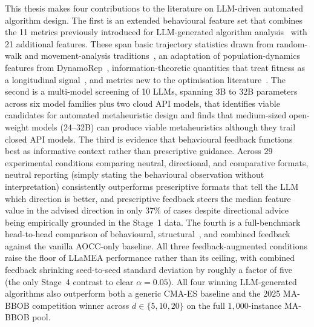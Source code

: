 \medskip

This thesis makes four contributions to the literature on LLM-driven automated algorithm design. The first is an extended behavioural feature set that combines the 11 metrics previously introduced for LLM-generated algorithm analysis~\cite{vanStein2025Behaviour} with 21 additional features. These span basic trajectory statistics drawn from random-walk and movement-analysis traditions~\cite{codling2008randomwalk}, an adaptation of population-dynamics features from DynamoRep~\cite{cenikj2023dynamorep}, information-theoretic quantities that treat fitness as a longitudinal signal~\cite{richman2000sampen,bandt2002permutation,weinberger1990fitness,lempel1976complexity}, and metrics new to the optimisation literature~\cite{barabasi2005bursts}. The second is a multi-model screening of 10 LLMs, spanning 3B to 32B parameters across six model families plus two cloud API models, that identifies viable candidates for automated metaheuristic design and finds that medium-sized open-weight models (24--32B) can produce viable metaheuristics although they trail closed API models. The third is evidence that behavioural feedback functions best as informative context rather than prescriptive guidance. Across 29 experimental conditions comparing neutral, directional, and comparative formats, neutral reporting (simply stating the behavioural observation without interpretation) consistently outperforms prescriptive formats that tell the LLM which direction is better, and prescriptive feedback steers the median feature value in the advised direction in only 37\% of cases despite directional advice being empirically grounded in the Stage~1 data. The fourth is a full-benchmark head-to-head comparison of behavioural, structural~\cite{vanStein2026LLaMEASAGE}, and combined feedback against the vanilla AOCC-only baseline. All three feedback-augmented conditions raise the floor of LLaMEA performance rather than its ceiling, with combined feedback shrinking seed-to-seed standard deviation by roughly a factor of five (the only Stage~4 contrast to clear $\alpha = 0.05$). All four winning LLM-generated algorithms also outperform both a generic CMA-ES baseline and the 2025 MA-BBOB competition winner across $d \in \{5, 10, 20\}$ on the full $1{,}000$-instance MA-BBOB pool.
